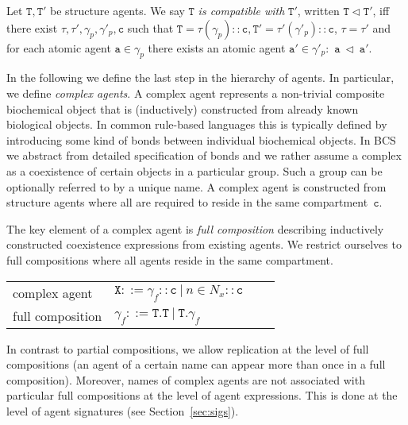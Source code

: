 \documentclass{entcs}
\renewcommand{\~}[0]{\texttildelow}
\newcommand{\choice}{|}
\begin{document}

\begin{defn}
Let $\mathtt{T},\mathtt{T}'$ be structure agents. We say $\mathtt{T}$ \emph{is compatible with} $\mathtt{T}'$, written $\mathtt{T} \lhd \mathtt{T}'$, iff there exist $\tau,\tau',\gamma_p,\gamma'_p,\mathtt{c}$ such that $\mathtt{T}=\tau(\gamma_p)::\mathtt{c},\mathtt{T}'=\tau'(\gamma'_p)::\mathtt{c}$, $\tau = \tau'$ and for each atomic agent $\mathtt{a} \in \gamma_p$ there exists an atomic agent $\mathtt{a}' \in \gamma'_p:$ $\mathtt{a}~\lhd~\mathtt{a}'$. 
\end{defn}

In the following we define the last step in the hierarchy of agents. In particular, we define \textit{complex agents}. A complex agent represents a non-trivial composite biochemical object that is (inductively) constructed from already known biological objects. In common rule-based languages this is typically defined by introducing some kind of bonds between individual biochemical objects. In BCS we abstract from detailed specification of bonds and we rather assume a complex as a coexistence of certain objects in a particular group. Such a group can be optionally referred to by a unique name. A complex agent is constructed from structure agents where all are required to reside in the same compartment~$\mathtt{c}$. 



The key element of a complex agent is \emph{full composition} describing inductively constructed coexistence expressions from existing agents. We restrict ourselves to full compositions where all agents reside in the same compartment.

\begin{center}
{\small
\hspace*{-1cm}\begin{tabular}{ ll ll }
 complex agent & $\mathtt{X}::=\gamma_f::\mathtt{c}~\choice~n\in{N}_{x}::\mathtt{c}$\\
 full composition & $\gamma_f ::= \mathtt{T}.\mathtt{T}~\choice~\mathtt{T}.\gamma_f$\\
\end{tabular}
}
\end{center}

In contrast to partial compositions, we allow replication at the level of full compositions (an agent of a certain name can appear more than once in a full composition). Moreover, names of complex agents are not associated with particular full compositions at the level of agent expressions. This is done at the level of agent signatures (see Section~\ref{sec:sigs}).
\end{document}
